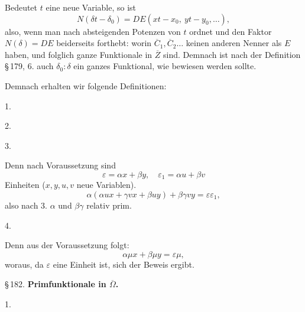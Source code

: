 Bedeutet $t$ eine neue Variable, so ist
\[
N(\delta t - \delta_0) = D E(x t - x_0,\ y t - y_0, \ldots),
\]
also, wenn man nach absteigenden Potenzen von $t$ ordnet und den Faktor $N(\delta) = D E$ beiderseits forthebt:
worin $\overline{C}_1, \overline{C}_2 \ldots$ keinen anderen Nenner als $E$ haben, und folglich ganze Funktionale in $\overline{Z}$ sind. Demnach ist nach der Definition \S\,179, 6. auch $\delta_0 : \delta$ ein ganzes Funktional, wie bewiesen werden sollte.

Demnach erhalten wir folgende Definitionen:

1. 

2. 

3. 

Denn nach Voraussetzung sind
\[
\varepsilon = \alpha x + \beta y,\quad \varepsilon_1 = \alpha u + \beta v
\]
Einheiten ($x, y, u, v$ neue Variablen).
\[
\alpha(\alpha u x + \gamma v x + \beta u y) + \beta \gamma v y = \varepsilon \varepsilon_1,
\]
also nach 3. $\alpha$ und $\beta\gamma$ relativ prim.

4. 

Denn aus der Voraussetzung folgt:
\[
\alpha \mu x + \beta \mu y = \varepsilon \mu,
\]
woraus, da $\varepsilon$ eine Einheit ist, sich der Beweis ergibt.

\begin{center}
\S\,182. \textbf{Primfunktionale in $\overline{\Omega}$.}
\end{center}

1. 

